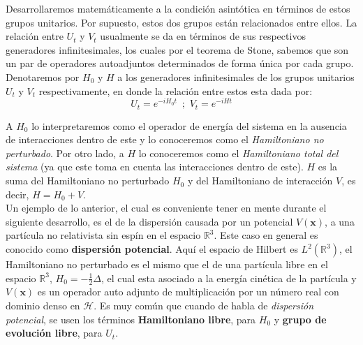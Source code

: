 \documentclass[12pt]{book}
\numberwithin{equation}{chapter}
\def\R{\mathbb{R}}
\def\H{\mathcal{H}}
\def\x{\mathbf{x}}
\begin{document}
Desarrollaremos matem\'aticamente a la condici\'on asint\'otica en t\'erminos de estos grupos unitarios. Por supuesto, estos dos grupos est\'an relacionados entre ellos. La relaci\'on entre $U_{t}$ y $V_{t}$ usualmente se da en t\'erminos de sus respectivos generadores infinitesimales, los cuales por el teorema de Stone, sabemos que son un par de operadores autoadjuntos determinados de forma \'unica por cada grupo. Denotaremos por $H_{0}$ y $H$ a los generadores infinitesimales de los grupos unitarios $U_{t}$ y $V_{t}$ respectivamente, en donde la relaci\'on entre estos esta dada por:
\begin{equation}
U_{t}= e^{-i H_{0}t } \,\,\,;\,\, V_{t}= e^{-i H t}
\end{equation}

A $H_{0}$ lo interpretaremos como el operador de energ\'ia del sistema en la ausencia de interacciones dentro de este y lo conoceremos como el \emph{Hamiltoniano no perturbado}. Por otro lado, a $H$ lo conoceremos como el \emph{Hamiltoniano total del sistema} (ya que este toma en cuenta las interacciones dentro de este). $H$ es la suma del Hamiltoniano no perturbado $H_{0}$ y del Hamiltoniano de interacci\'on $V$, es decir, $H= H_{0} + V$. \\
Un ejemplo de lo anterior, el cual es conveniente tener en mente durante el siguiente desarrollo, es el de la dispersi\'on causada por un potencial $V(\x)$, a una part\'icula no relativista sin esp\'in en el espacio $\R^{3}$. Este caso en general es conocido como {\bf dispersi\'on potencial}. Aqu\'i el espacio de Hilbert es $L^{2}(\R^{3})$, el Hamiltoniano no perturbado es el mismo que el de una part\'icula libre en el espacio $\R^{3}$, $H_{0}= - \frac{1}{2} \Delta $, el cual esta asociado a la energ\'ia cin\'etica de la part\'icula y $V(\x)$ es un operador auto adjunto de multiplicaci\'on por un n\'umero real con dominio denso en $\H$. Es muy com\'un que cuando de habla de \emph{dispersi\'on potencial}, se usen los t\'erminos {\bf Hamiltoniano libre}, para $H_{0}$ y {\bf grupo de evoluci\'on libre}, para $U_{t}$.\\
\end{document}
